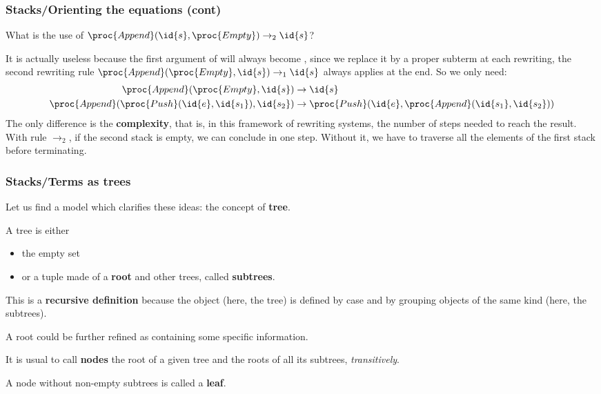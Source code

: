 %
\begin{frame}
\frametitle{Stacks/Orienting the equations (cont)} 

What is the use of \(\proc{Append} (\id{s}, \proc{Empty})
\rightarrow_2 \id{s}\)?

\bigskip

It is actually useless because the first argument of 
will always become , since we replace it by a proper
subterm at each rewriting, the second rewriting rule \(\proc{Append}
(\proc{Empty}, \id{s}) \rightarrow_1 \id{s}\) always applies at the
end. So we only need:
\begin{align*}
   \proc{Append} (\proc{Empty}, \id{s}) 
&\rightarrow \id{s}\\
   \proc{Append} (\proc{Push} (\id{e}, \id{s_1}), \id{s_2})
&\rightarrow \proc{Push} (\id{e}, \proc{Append} (\id{s_1}, \id{s_2}))
\end{align*}
The only difference is the \textbf{complexity}, that is, in this
framework of rewriting systems, the number of steps needed to reach
the result. With rule \(\rightarrow_2\), if the second stack is empty,
we can conclude in one step. Without it, we have to traverse all the
elements of the first stack before terminating.

\end{frame}

%
\begin{frame}
\frametitle{Stacks/Terms as trees}

Let us find a model which clarifies these ideas: the concept of
\textbf{tree}.

\bigskip

A tree is either 
\begin{itemize}

  \item the empty set

  \item or a tuple made of a \textbf{root} and other trees, called
  \textbf{subtrees}.

\end{itemize}
This is a \textbf{recursive definition} because the object (here, the
tree) is defined by case and by grouping objects of the same kind
(here, the subtrees).

\bigskip

A root could be further refined as containing some specific
information.

\bigskip

It is usual to call \textbf{nodes} the root of a given tree and the
roots of all its subtrees, \emph{transitively}.

\bigskip

A node without non-empty subtrees is called a \textbf{leaf}.

\end{frame}

